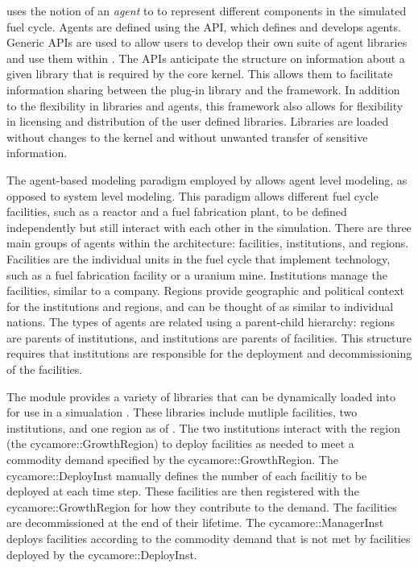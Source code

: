 \Cyclus uses the notion of an \textit{agent} to to represent different 
components in the simulated fuel cycle. Agents are 
defined using the \Cyclus \gls{API}, which 
defines and develops agents. Generic \glspl{API} are used to allow users 
to develop their own suite of agent libraries and use them within \Cyclus. 
The \glspl{API} anticipate the structure on information about a given library 
that is required by the core \Cyclus kernel. This allows them to facilitate 
information sharing between the plug-in library and the \Cyclus framework. 
In addition to the flexibility in libraries and agents, this framework 
also allows for flexibility in licensing and distribution of the user 
defined libraries. Libraries are loaded without changes to the \Cyclus 
kernel and without unwanted transfer of sensitive information. 

The agent-based modeling paradigm employed by \Cyclus allows agent level 
modeling, as opposed to system level modeling. This paradigm allows different 
fuel cycle facilities, such as a reactor and a fuel fabrication plant, to 
be defined independently but still interact with each other in the 
simulation. There are three main groups of agents within the \Cyclus 
architecture: facilities, institutions, and regions. Facilities are 
the individual units in the fuel cycle that implement technology, 
such as a fuel fabrication facility or a uranium mine. Institutions 
manage the facilities, similar to a company. Regions provide geographic 
and political context for the institutions and regions, and can be thought 
of as similar to individual nations. The types of agents are related using 
a parent-child hierarchy: regions are
parents of institutions, and institutions are parents of facilities. This 
structure requires that institutions are responsible for the deployment 
and decommissioning of the facilities. 

The \Cycamore module provides a variety of libraries that can be 
dynamically loaded into \Cyclus for use in a simualation 
\cite{carlsen_cycamore_2014,huff_fundamental_2016}. These libraries 
include mutliple facilities, two institutions, and one region as of 
. The two institutions interact with the region (the 
cycamore::GrowthRegion) to deploy facilities as needed to meet a 
commodity demand specified by the cycamore::GrowthRegion. 
The cycamore::DeployInst manually defines the number of each facilitiy 
to be deployed at each time step. These facilities are then registered with 
the cycamore::GrowthRegion for how they contribute to the demand. The 
facilities are decommissioned at the end of their lifetime. The 
cycamore::ManagerInst deploys facilities according to the commodity 
demand that is not met by facilities deployed by the cycamore::DeployInst. 

